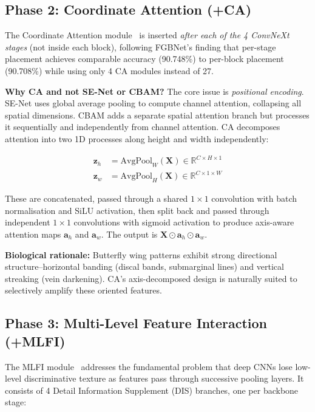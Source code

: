\documentclass[10pt, twocolumn]{article}
\begin{document}
\subsection{Phase 2: Coordinate Attention (+CA)}
\label{sec:ca}

The Coordinate Attention module~\cite{hou2021coordinate} is inserted \emph{after each of the 4 ConvNeXt stages} (not inside each block), following FGBNet's finding that per-stage placement achieves comparable accuracy (90.748\%) to per-block placement (90.708\%) while using only 4 CA modules instead of 27.

\textbf{Why CA and not SE-Net or CBAM?}
The core issue is \emph{positional encoding}. SE-Net uses global average pooling to compute channel attention, collapsing all spatial dimensions. CBAM adds a separate spatial attention branch but processes it sequentially and independently from channel attention. CA decomposes attention into two 1D processes along height and width independently:

\vspace{-0.3cm}
\begin{align}
    \mathbf{z}_h &= \text{AvgPool}_W(\mathbf{X}) \in \mathbb{R}^{C \times H \times 1} \\
    \mathbf{z}_w &= \text{AvgPool}_H(\mathbf{X}) \in \mathbb{R}^{C \times 1 \times W}
\end{align}

These are concatenated, passed through a shared $1\times1$ convolution with batch normalisation and SiLU activation, then split back and passed through independent $1\times1$ convolutions with sigmoid activation to produce axis-aware attention maps $\mathbf{a}_h$ and $\mathbf{a}_w$. The output is $\mathbf{X} \odot \mathbf{a}_h \odot \mathbf{a}_w$.

\textbf{Biological rationale:} Butterfly wing patterns exhibit strong directional structure--horizontal banding (discal bands, submarginal lines) and vertical streaking (vein darkening). CA's axis-decomposed design is naturally suited to selectively amplify these oriented features.

\subsection{Phase 3: Multi-Level Feature Interaction (+MLFI)}
\label{sec:mlfi}

The MLFI module~\cite{yuan2025fgbnet} addresses the fundamental problem that deep CNNs lose low-level discriminative texture as features pass through successive pooling layers. It consists of 4 Detail Information Supplement (DIS) branches, one per backbone stage:
\end{document}
